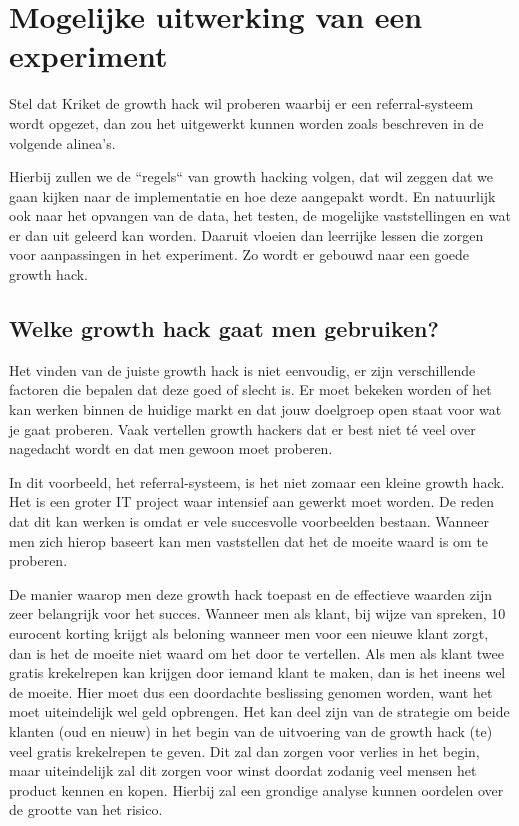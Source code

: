 \section{Mogelijke uitwerking van een experiment}
\label{sec:mogelijke-uitwerking-van-een-experiment}
Stel dat Kriket de growth hack wil proberen waarbij er een referral-systeem wordt opgezet, dan zou het uitgewerkt kunnen worden zoals beschreven in de volgende alinea's.

Hierbij zullen we de ``regels`` van growth hacking volgen, dat wil zeggen dat we gaan kijken naar de implementatie en hoe deze aangepakt wordt. En natuurlijk ook naar het opvangen van de data, het testen, de mogelijke vaststellingen en wat er dan uit geleerd kan worden. Daaruit vloeien dan leerrijke lessen die zorgen voor aanpassingen in het experiment. Zo wordt er gebouwd naar een goede growth hack.

\subsection{Welke growth hack gaat men gebruiken?}
\label{subsec:welke-growth-hack}
Het vinden van de juiste growth hack is niet eenvoudig, er zijn verschillende factoren die bepalen dat deze goed of slecht is. Er moet bekeken worden of het kan werken binnen de huidige markt en dat jouw doelgroep open staat voor wat je gaat proberen. Vaak vertellen growth hackers dat er best niet té veel over nagedacht wordt en dat men gewoon moet proberen. 

In dit voorbeeld, het referral-systeem, is het niet zomaar een kleine growth hack. Het is een groter IT project waar intensief aan gewerkt moet worden. De reden dat dit kan werken is omdat er vele succesvolle voorbeelden bestaan. Wanneer men zich hierop baseert kan men vaststellen dat het de moeite waard is om te proberen.

De manier waarop men deze growth hack toepast en de effectieve waarden zijn zeer belangrijk voor het succes. Wanneer men als klant, bij wijze van spreken, 10 eurocent korting krijgt als beloning wanneer men voor een nieuwe klant zorgt, dan is het de moeite niet waard om het door te vertellen. Als men als klant twee gratis krekelrepen kan krijgen door iemand klant te maken, dan is het ineens wel de moeite. Hier moet dus een doordachte beslissing genomen worden, want het moet uiteindelijk wel geld opbrengen. Het kan deel zijn van de strategie om beide klanten (oud en nieuw) in het begin van de uitvoering van de growth hack (te) veel gratis krekelrepen te geven. Dit zal dan zorgen voor verlies in het begin, maar uiteindelijk zal dit zorgen voor winst doordat zodanig veel mensen het product kennen en kopen. Hierbij zal een grondige analyse kunnen oordelen over de grootte van het risico.

